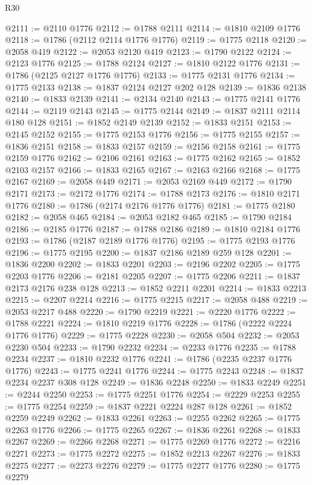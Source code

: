 \begin{lexlean}{R30}
\begin{coremodule}
{{{{{@2111 := @2110 @1776
@2112 := @1788 @2111
@2114 := @1810 @2109 @1776
@2118 := @1786 (@2112 @2114 @1776 @1776)
@2119 := @1775 @2118
@2120 := @2058 @419
@2122 := @2053 @2120 @419
@2123 := @1790 @2122
@2124 := @2123 @1776
@2125 := @1788 @2124
@2127 := @1810 @2122 @1776
@2131 := @1786 (@2125 @2127 @1776 @1776)
@2133 := @1775 @2131 @1776
@2134 := @1775 @2133
@2138 := @1837 @2124 @2127 @202 @128
@2139 := @1836 @2138
@2140 := @1833 @2139
@2141 := @2134 @2140
@2143 := @1775 @2141 @1776
@2144 := @2119 @2143
@2145 := @1775 @2144
@2149 := @1837 @2111 @2114 @180 @128
@2151 := @1852 @2149 @2139
@2152 := @1833 @2151
@2153 := @2145 @2152
@2155 := @1775 @2153 @1776
@2156 := @1775 @2155
@2157 := @1836 @2151
@2158 := @1833 @2157
@2159 := @2156 @2158
@2161 := @1775 @2159 @1776
@2162 := @2106 @2161
@2163 := @1775 @2162
@2165 := @1852 @2103 @2157
@2166 := @1833 @2165
@2167 := @2163 @2166
@2168 := @1775 @2167
@2169 := @2058 @449
@2171 := @2053 @2169 @449
@2172 := @1790 @2171
@2173 := @2172 @1776
@2174 := @1788 @2173
@2176 := @1810 @2171 @1776
@2180 := @1786 (@2174 @2176 @1776 @1776)
@2181 := @1775 @2180
@2182 := @2058 @465
@2184 := @2053 @2182 @465
@2185 := @1790 @2184
@2186 := @2185 @1776
@2187 := @1788 @2186
@2189 := @1810 @2184 @1776
@2193 := @1786 (@2187 @2189 @1776 @1776)
@2195 := @1775 @2193 @1776
@2196 := @1775 @2195
@2200 := @1837 @2186 @2189 @259 @128
@2201 := @1836 @2200
@2202 := @1833 @2201
@2203 := @2196 @2202
@2205 := @1775 @2203 @1776
@2206 := @2181 @2205
@2207 := @1775 @2206
@2211 := @1837 @2173 @2176 @238 @128
@2213 := @1852 @2211 @2201
@2214 := @1833 @2213
@2215 := @2207 @2214
@2216 := @1775 @2215
@2217 := @2058 @488
@2219 := @2053 @2217 @488
@2220 := @1790 @2219
@2221 := @2220 @1776
@2222 := @1788 @2221
@2224 := @1810 @2219 @1776
@2228 := @1786 (@2222 @2224 @1776 @1776)
@2229 := @1775 @2228
@2230 := @2058 @504
@2232 := @2053 @2230 @504
@2233 := @1790 @2232
@2234 := @2233 @1776
@2235 := @1788 @2234
@2237 := @1810 @2232 @1776
@2241 := @1786 (@2235 @2237 @1776 @1776)
@2243 := @1775 @2241 @1776
@2244 := @1775 @2243
@2248 := @1837 @2234 @2237 @308 @128
@2249 := @1836 @2248
@2250 := @1833 @2249
@2251 := @2244 @2250
@2253 := @1775 @2251 @1776
@2254 := @2229 @2253
@2255 := @1775 @2254
@2259 := @1837 @2221 @2224 @287 @128
@2261 := @1852 @2259 @2249
@2262 := @1833 @2261
@2263 := @2255 @2262
@2265 := @1775 @2263 @1776
@2266 := @1775 @2265
@2267 := @1836 @2261
@2268 := @1833 @2267
@2269 := @2266 @2268
@2271 := @1775 @2269 @1776
@2272 := @2216 @2271
@2273 := @1775 @2272
@2275 := @1852 @2213 @2267
@2276 := @1833 @2275
@2277 := @2273 @2276
@2279 := @1775 @2277 @1776
@2280 := @1775 @2279
}}}}}
\end{coremodule}
\end{lexlean}
